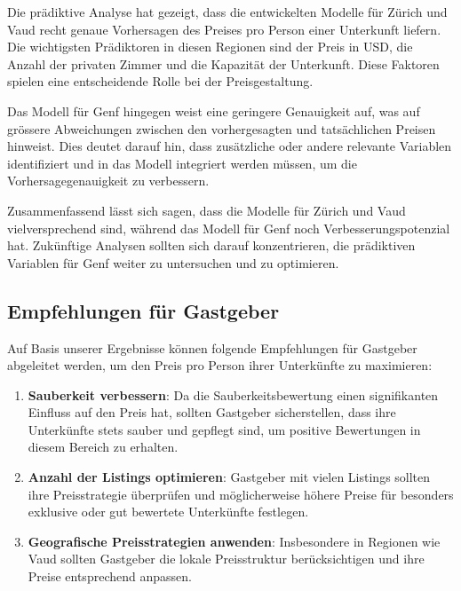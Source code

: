 \documentclass[
  journal,
]{IEEEtran}%
\begin{document}
Die prädiktive Analyse hat gezeigt, dass die entwickelten Modelle für
Zürich und Vaud recht genaue Vorhersagen des Preises pro Person einer
Unterkunft liefern. Die wichtigsten Prädiktoren in diesen Regionen sind
der Preis in USD, die Anzahl der privaten Zimmer und die Kapazität der
Unterkunft. Diese Faktoren spielen eine entscheidende Rolle bei der
Preisgestaltung.

Das Modell für Genf hingegen weist eine geringere Genauigkeit auf, was
auf grössere Abweichungen zwischen den vorhergesagten und tatsächlichen
Preisen hinweist. Dies deutet darauf hin, dass zusätzliche oder andere
relevante Variablen identifiziert und in das Modell integriert werden
müssen, um die Vorhersagegenauigkeit zu verbessern.

Zusammenfassend lässt sich sagen, dass die Modelle für Zürich und Vaud
vielversprechend sind, während das Modell für Genf noch
Verbesserungspotenzial hat. Zukünftige Analysen sollten sich darauf
konzentrieren, die prädiktiven Variablen für Genf weiter zu untersuchen
und zu optimieren.

\hypertarget{empfehlungen-fuxfcr-gastgeber}{%
\subsection{Empfehlungen für
Gastgeber}\label{empfehlungen-fuxfcr-gastgeber}}

Auf Basis unserer Ergebnisse können folgende Empfehlungen für Gastgeber
abgeleitet werden, um den Preis pro Person ihrer Unterkünfte zu
maximieren:

\begin{enumerate}
\def\labelenumi{\arabic{enumi}.}
\item
  \textbf{Sauberkeit verbessern}: Da die Sauberkeitsbewertung einen
  signifikanten Einfluss auf den Preis hat, sollten Gastgeber
  sicherstellen, dass ihre Unterkünfte stets sauber und gepflegt sind,
  um positive Bewertungen in diesem Bereich zu erhalten.
\item
  \textbf{Anzahl der Listings optimieren}: Gastgeber mit vielen Listings
  sollten ihre Preisstrategie überprüfen und möglicherweise höhere
  Preise für besonders exklusive oder gut bewertete Unterkünfte
  festlegen.
\item
  \textbf{Geografische Preisstrategien anwenden}: Insbesondere in
  Regionen wie Vaud sollten Gastgeber die lokale Preisstruktur
  berücksichtigen und ihre Preise entsprechend anpassen.
\end{enumerate}
\end{document}
